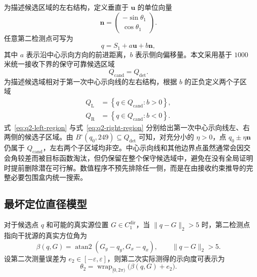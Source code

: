 为描述候选区域的左右结构，定义垂直于 $\mathbf u$ 的单位向量
\begin{equation}
  \mathbf n=
  \begin{pmatrix}
    -\sin\theta_1\\
    \cos\theta_1
  \end{pmatrix}.
  \label{eq:q2-normal-direction}
\end{equation}
任意第二检测点可写为
\begin{equation}
  q=S_1+a\mathbf u+b\mathbf n,
  \label{eq:q2-candidate-parameterization}
\end{equation}
其中 $a$ 表示沿中心示向方向的前进距离，$b$ 表示侧向偏移量。本文采用基于 $1000$ 米统一接收下界的保守可靠候选区域
\begin{equation}
  Q_{\mathrm{cand}}=Q_{\mathrm{det}}.
  \label{eq:q2-candidate-region}
\end{equation}
为描述候选域相对于第一次中心示向线的左右结构，根据 $b$ 的正负定义两个子区域
\begin{align}
  Q_{\mathrm L}
  &=\left\{q\in Q_{\mathrm{cand}}:b>0\right\},
  \label{eq:q2-left-region}\\
  Q_{\mathrm R}
  &=\left\{q\in Q_{\mathrm{cand}}:b<0\right\}.
  \label{eq:q2-right-region}
\end{align}
式~\eqref{eq:q2-left-region} 与式~\eqref{eq:q2-right-region} 分别给出第一次中心示向线左、右两侧的候选子区域。由 $B^\circ(q_0,249)\subseteq Q_{\mathrm{det}}$ 可知，对充分小的 $\eta>0$，点 $q_0\pm\eta\mathbf n$ 仍属于 $Q_{\mathrm{cand}}$，左右两个子区域均非空。中心示向线和其他边界点虽然通常会因交会角较差而被目标函数淘汰，但仍保留在整个保守候选域中，避免在没有全局证明时提前删除潜在可行解。数值程序不预先排除任一侧，而是在由接收约束推导的完整必要包围盒内统一搜索。

\subsection{最坏定位直径模型}

对于候选点 $q$ 和可能的真实源位置 $G\in C_1^{\mathrm{dir}}$，当 $\|q-G\|_2>5$ 时，第二检测点指向干扰源的真实方位角为
\begin{equation}
  \beta(q,G)=\operatorname{atan2}(G_y-q_y,G_x-q_x),
  \qquad \|q-G\|_2>5.
  \label{eq:q2-true-bearing}
\end{equation}
设第二次测量误差为 $e_2\in[-\varepsilon,\varepsilon]$，则第二次实际测得的示向度可表示为
\begin{equation}
  \theta_2=\operatorname{wrap}_{[0,2\pi)}\bigl(\beta(q,G)+e_2\bigr).
  \label{eq:q2-second-bearing}
\end{equation}

